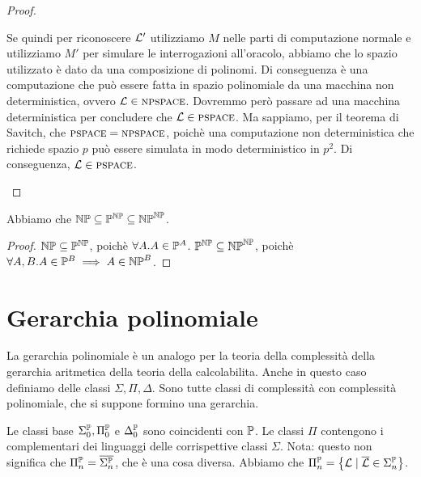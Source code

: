 \begin{proof}
\begin{enumerate}
                    Se quindi per riconoscere $\mathcal{L}'$ utilizziamo $M$ nelle parti di computazione
                    normale e utilizziamo $M'$ per simulare le interrogazioni all'oracolo, abbiamo
                    che lo spazio utilizzato è dato da una composizione di polinomi. Di conseguenza
                    è una computazione che può essere fatta in spazio polinomiale da una macchina
                    non deterministica, ovvero $\mathcal{L} \in \textsc{npspace}$. Dovremmo però passare ad una
                    macchina deterministica per concludere che $\mathcal{L} \in \textsc{pspace}$. Ma sappiamo, per
                    il teorema di Savitch, che $\textsc{pspace} = \textsc{npspace}$, poichè una computazione non
                    deterministica che richiede spazio $p$ può essere simulata in modo
                    deterministico in $p^{2}$. Di conseguenza, $\mathcal{L} \in \textsc{pspace}$.
        \end{enumerate}
\end{proof}

\begin{thm}\label{thm:oracles1}
    Abbiamo che $\mathbb{NP} \subseteq \mathbb{P}^{\mathbb{NP}} \subseteq \mathbb{NP}^{\mathbb{NP}}$.
\end{thm}
\begin{proof}
    $\mathbb{NP} \subseteq \mathbb{P}^{\mathbb{NP}}$, poichè $\forall A. A \in \mathbb{P}^{A}$.
    $\mathbb{P}^{\mathbb{NP}} \subseteq \mathbb{NP}^{\mathbb{NP}}$, poichè $\forall A,B. A \in \mathbb{P}^{B}
    \implies A \in \mathbb{NP}^{B}$.
\end{proof}


\section{Gerarchia polinomiale}

La gerarchia polinomiale è un analogo per la teoria della complessità della gerarchia aritmetica
della teoria della calcolabilita. Anche in questo caso definiamo delle classi $\Sigma,\Pi,\Delta$.
Sono tutte classi di complessità con complessità polinomiale, che si suppone formino una
gerarchia.

Le classi base $\Sigma^{\mathbb{P}}_{0},\Pi^{\mathbb{P}}_{0}$ e $\Delta^{\mathbb{P}}_{0}$ sono coincidenti
con $\mathbb{P}$. Le classi $\Pi$ contengono i complementari dei linguaggi delle corrispettive classi
$\Sigma$. Nota: questo non significa che $\Pi_{n}^{\mathbb{P}} = \overline{\Sigma_{n}^{\mathbb{P}}}$, che è
una cosa diversa.  Abbiamo che $\Pi_{n}^{\mathbb{P}} = \left\{ \mathcal{L} \mid \overline{\mathcal{L}} \in
\Sigma_{n}^{\mathbb{P}}\right\}$.


